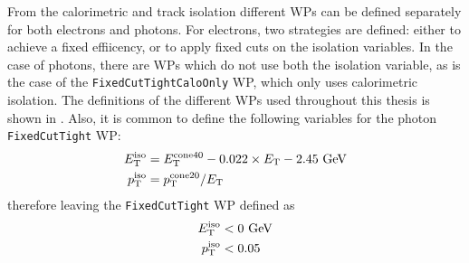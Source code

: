 \begin{table}[ht!]
    \caption{Summary of electron and photon isolation \acp{WP} use throughout this thesis.}
    \label{fig:objects:egamma:iso:iso_table}
\end{table}

From the calorimetric and track isolation different \acp{WP} can be defined separately for both electrons and photons. For electrons, two strategies are defined: either to achieve a fixed effiicency, or to apply fixed cuts on the isolation variables. In the case of photons, there are \acp{WP} which do not use both the isolation variable, as is the case of the \texttt{FixedCutTightCaloOnly} \ac{WP}, which only uses calorimetric isolation. The definitions of the different \acp{WP} used throughout this thesis is shown in \Tab{\ref{fig:objects:egamma:iso:iso_table}}. Also, it is common to define the following variables for the photon \texttt{FixedCutTight} \ac{WP}:
\begin{align}
    E_{\text{T}}^{\text{iso}} &= E_{\text{T}}^{\text{cone40}} - 0.022 \times E_{\text{T}} - 2.45~\text{GeV}\\
    p_{\text{T}}^{\text{iso}} &= p_{\text{T}}^{\text{cone20}} / E_{\text{T}}
\end{align}
therefore leaving the \texttt{FixedCutTight} \ac{WP} defined as
\begin{align}
    E_{\text{T}}^{\text{iso}} &< 0 ~\text{GeV}\\
    p_{\text{T}}^{\text{iso}} &< 0.05 
\end{align}















